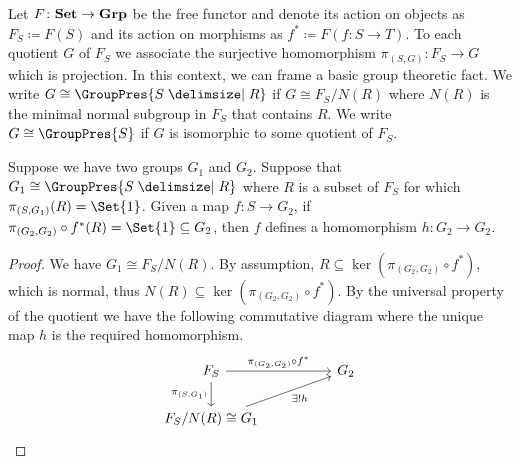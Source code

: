 Let $F \colon \mathbf{Set} \to \mathbf{Grp}$ be the free functor and denote its action on objects as $F_S \coloneqq F(S)$ and its action on morphisms as  $f^* \coloneqq F(f \colon S \to T)$.
To each quotient $G$ of $F_S$ we associate the surjective homomorphism $\pi_{(S,G)} \colon F_S \to G$ which is projection.
In this context, we can frame a basic group theoretic fact.
We write $G \cong \GroupPres{S \relations R}$ if  $G \cong F_S / N(R)$ where $N(R)$ is the minimal normal subgroup in $F_S$ that contains $R$.
We write  $G \cong \GroupPres{S}$ if  $G$ is isomorphic to some quotient of  $F_S$.

\begin{theorem}
	Suppose we have two groups $G_1$ and $G_2$.
	Suppose that $G_1 \cong \GroupPres{S \relations R}$ where $R$ is a subset of $F_S$ for which $\pi_{(S,G_1)}(R) = \Set{1}$.
	Given a map $f \colon S \to G_2$, if  $\pi_{(G_2, G_2)} \circ f^*(R) = \Set{1} \subseteq G_2$, then $f$ defines a homomorphism $h \colon G_2 \to G_2$.
	\label{thm:homomorphism_universal_prop}
\end{theorem}
\begin{proof}
	We have $G_1 \cong F_{S}/N(R)$.
	By assumption, $R \subseteq \ker(\pi_{(G_2,G_2)} \circ f^*)$, which is normal, thus $N(R) \subseteq \ker(\pi_{(G_2,G_2)} \circ f^*)$.
	By the universal property of the quotient we have the following commutative diagram where the unique map $h$ is the required homomorphism.
	\begin{equation*}
		\begin{tikzcd}
			F_{S} \ar[rr, "\pi_{(G_2,G_2)} \circ f^*"] \ar[d, "\pi_{(S,G_1)}"'] & & G_2 \\
			F_{S}/N(R) \cong G_1 \ar[rru, "\exists ! h"']
		\end{tikzcd}
	\end{equation*}
\end{proof}

